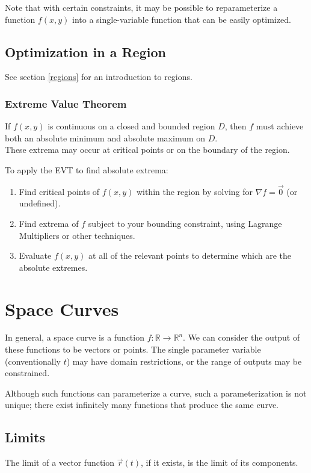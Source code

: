 \documentclass{article}
\newcommand{\vect}[1]{\ensuremath{\overrightarrow{#1}}}
\begin{document}
Note that with certain constraints, it may be possible to reparameterize a function $f(x,y)$ into a single-variable function that can be easily optimized.

\subsection{Optimization in a Region}
See section \ref{regions} for an introduction to regions.
\subsubsection{Extreme Value Theorem}
If $f(x,y)$ is continuous on a closed and bounded region $D$, then $f$ must achieve both an absolute minimum and absolute maximum on $D$.\\
These extrema may occur at critical points or on the boundary of the region.

To apply the EVT to find absolute extrema:
\begin{enumerate}
    \item Find critical points of $f(x,y)$ within the region by solving for $\nabla{f} = \vect{0}$ (or undefined).
    \item Find extrema of $f$ subject to your bounding constraint, using Lagrange Multipliers or other techniques.
    \item Evaluate $f(x,y)$ at all of the relevant points to determine which are the absolute extremes.
\end{enumerate}

\section{Space Curves}
In general, a space curve is a function $f: \mathbb{R}\to\mathbb{R}^n$. We can consider the output of these functions to be vectors or points. The single parameter variable (conventionally $t$) may have domain restrictions, or the range of outputs may be constrained.

Although such functions can parameterize a curve, such a parameterization is not unique; there exist infinitely many functions that produce the same curve.

\subsection{Limits}
The limit of a vector function $\vect{r}(t)$, if it exists, is the limit of its components.
\end{document}
